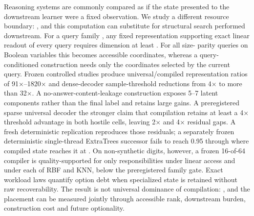 \markdownRendererDocumentBegin
Reasoning systems are commonly compared as if the state presented to the downstream learner were a fixed observation. We study a different resource boundary: , and this computation can substitute for structural search performed downstream. For a query family , any fixed representation supporting exact linear readout of every query requires dimension at least . For all size- parity queries on  Boolean variables this becomes  accessible coordinates, whereas a query-conditioned construction needs only the coordinates selected by the current query. Frozen controlled studies produce universal/compiled representation ratios of 91×–1820× and dense-decoder sample-threshold reductions from 4× to more than 32×. A no-answer-content-leakage construction exposes 5–7 latent components rather than the final label and retains large gains. A preregistered sparse universal decoder  the stronger claim that compilation retains at least a 4× threshold advantage in both hostile cells, leaving 2× and 4× residual gaps. A fresh deterministic replication reproduces those residuals; a separately frozen deterministic single-thread ExtraTrees successor fails to reach 0.95 through  where compiled state reaches it at . On non-synthetic digits, however, a frozen 16-of-64 compiler is quality-supported for only  responsibilities under linear access and  under each of RBF and KNN, below the preregistered  family gate. Exact workload laws quantify option debt when specialized state is retained without raw recoverability. The result is not universal dominance of compilation: , and the placement can be measured jointly through accessible rank, downstream burden, construction cost and future optionality.\markdownRendererDocumentEnd